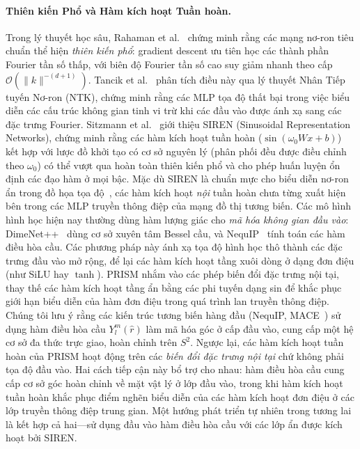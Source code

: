 \documentclass[10pt,twocolumn,letterpaper]{article}
\begin{document}
\paragraph{Thiên kiến Phổ và Hàm kích hoạt Tuần hoàn.}
Trong lý thuyết học sâu, Rahaman et al.~\cite{rahaman2019spectral} chứng minh rằng các mạng nơ-ron tiêu chuẩn thể hiện \textit{thiên kiến phổ}: gradient descent ưu tiên học các thành phần Fourier tần số thấp, với biên độ Fourier tần số cao suy giảm nhanh theo cấp $\mathcal{O}(\|k\|^{-(d+1)})$.
Tancik et al.~\cite{tancik2020fourier} phân tích điều này qua lý thuyết Nhân Tiếp tuyến Nơ-ron (NTK), chứng minh rằng các MLP tọa độ thất bại trong việc biểu diễn các cấu trúc không gian tinh vi trừ khi các đầu vào được ánh xạ sang các đặc trưng Fourier.
Sitzmann et al.~\cite{sitzmann2020siren} giới thiệu SIREN (Sinusoidal Representation Networks), chứng minh rằng các hàm kích hoạt tuần hoàn ($\sin(\omega_0 W x + b)$) kết hợp với lược đồ khởi tạo có cơ sở nguyên lý (phân phối đều được điều chỉnh theo $\omega_0$) có thể vượt qua hoàn toàn thiên kiến phổ và cho phép huấn luyện ổn định các đạo hàm ở mọi bậc.
Mặc dù SIREN là chuẩn mực cho biểu diễn nơ-ron ẩn trong đồ họa tọa độ~\cite{sitzmann2020siren}, các hàm kích hoạt \textit{nội} tuần hoàn chưa từng xuất hiện bên trong các MLP truyền thông điệp của mạng đồ thị tương biến. Các mô hình hình học hiện nay thường dùng hàm lượng giác cho \textit{mã hóa không gian đầu vào}: DimeNet++~\cite{klicperaFastUncertaintyAwareDirectional2020} dùng cơ sở xuyên tâm Bessel cầu, và NequIP~\cite{batznerE3equivariantGraphNeural2021} tính toán các hàm điều hòa cầu. Các phương pháp này ánh xạ tọa độ hình học thô thành các đặc trưng đầu vào mở rộng, để lại các hàm kích hoạt tầng xuôi dòng ở dạng đơn điệu (như SiLU hay $\tanh$). PRISM nhắm vào các phép biến đổi đặc trưng nội tại, thay thế các hàm kích hoạt tầng ẩn bằng các phi tuyến dạng sin để khắc phục giới hạn biểu diễn của hàm đơn điệu trong quá trình lan truyền thông điệp.
Chúng tôi lưu ý rằng các kiến trúc tương biến hàng đầu (NequIP, MACE~\cite{batatiaMACEHigherOrder2022}) sử dụng hàm điều hòa cầu $Y_l^m(\hat{r})$ làm mã hóa góc ở cấp đầu vào, cung cấp một hệ cơ sở đa thức trực giao, hoàn chỉnh trên $S^2$. Ngược lại, các hàm kích hoạt tuần hoàn của PRISM hoạt động trên các \textit{biến đổi đặc trưng nội tại} chứ không phải tọa độ đầu vào. Hai cách tiếp cận này bổ trợ cho nhau: hàm điều hòa cầu cung cấp cơ sở góc hoàn chỉnh về mặt vật lý ở lớp đầu vào, trong khi hàm kích hoạt tuần hoàn khắc phục điểm nghẽn biểu diễn của các hàm kích hoạt đơn điệu ở các lớp truyền thông điệp trung gian. Một hướng phát triển tự nhiên trong tương lai là kết hợp cả hai---sử dụng đầu vào hàm điều hòa cầu với các lớp ẩn được kích hoạt bởi SIREN.
\end{document}
